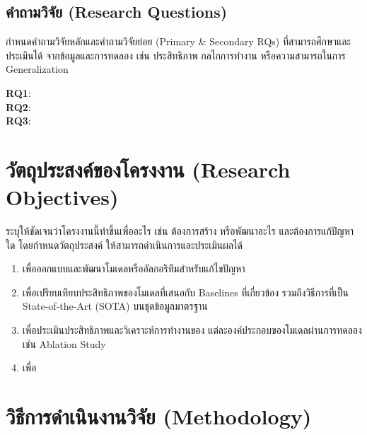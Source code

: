 \documentclass[20pt,a4paper]{article}
\begin{document}
\noindent\dotfill

\noindent\dotfill

\noindent\dotfill

\subsection{คำถามวิจัย (Research Questions)}

กำหนดคำถามวิจัยหลักและคำถามวิจัยย่อย
(Primary \& Secondary RQs) ที่สามารถศึกษาและประเมินได้
จากข้อมูลและการทดลอง เช่น ประสิทธิภาพ กลไกการทำงาน
หรือความสามารถในการ Generalization

\begin{description}
\item[\textbf{RQ1}:] \dotfill
\item[\textbf{RQ2}:] \dotfill
\item[\textbf{RQ3}:] \dotfill
\end{description}


\section{วัตถุประสงค์ของโครงงาน (Research Objectives)}

ระบุให้ชัดเจนว่าโครงงานนี้ทำขึ้นเพื่ออะไร เช่น ต้องการสร้าง
หรือพัฒนาอะไร และต้องการแก้ปัญหาใด โดยกำหนดวัตถุประสงค์
ให้สามารถดำเนินการและประเมินผลได้

\begin{enumerate}
    \item เพื่อออกแบบและพัฒนาโมเดลหรืออัลกอริทึมสำหรับแก้ไขปัญหา \dotfill

    \item เพื่อเปรียบเทียบประสิทธิภาพของโมเดลที่เสนอกับ
    Baselines ที่เกี่ยวข้อง รวมถึงวิธีการที่เป็น
    State-of-the-Art (SOTA) บนชุดข้อมูลมาตรฐาน

    \item เพื่อประเมินประสิทธิภาพและวิเคราะห์การทำงานของ
    แต่ละองค์ประกอบของโมเดลผ่านการทดลอง เช่น Ablation Study

    \item เพื่อ\dotfill
\end{enumerate}


\section{วิธีการดำเนินงานวิจัย (Methodology)}
\end{document}
